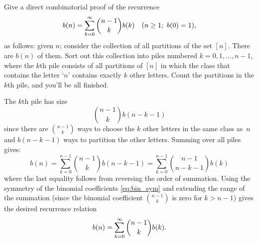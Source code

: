 \begin{exercise}
    Give a direct combinatorial proof of the recurrence 
    \[
        b(n) = \bsum[k] \binom{n-1}{k}b(k) \quad (n\geq 1;\ b(0)=1),
    \]
    as follows: given $n$; consider the collection of all partitions of the set $[n]$. There are $b(n)$ of them. Sort out this collection into piles numbered $k=0,1,\ldots,n-1$, where the $k$th pile consists of all partitions of $[n]$ in which the class that contains the letter `$n$' contains exactly $k$ other letters. Count the partitions in the $k$th pile, and you'll be all finished.
\end{exercise}
\begin{solution}
    The $k$th pile has size
    \[
        \binom{n-1}{k}b(n-k-1)
    \]
    since there are $\binom{n-1}{k}$ ways to choose the $k$ other letters in the same class as~$n$ and $b(n-k-1)$ ways to partition the other letters. Summing over all piles gives:
    \[
        b(n) = \sum_{k=0}^{n-1} \binom{n-1}{k} b(n-k-1)  = \sum_{k=0}^{n-1} \binom{n-1}{n-k-1} b(k)
    \]
    where the last equality follows from reversing the order of summation. Using the symmetry of the binomial coefficients \eqref{eq:bin_sym} and extending the range of the summation (since the binomial coefficient $\binom{n-1}{k}$ is zero for $k > n - 1$) gives the desired recurrence relation
    \[
        b(n) = \bsum[k] \binom{n-1}{k}b(k).
    \]
\end{solution}

